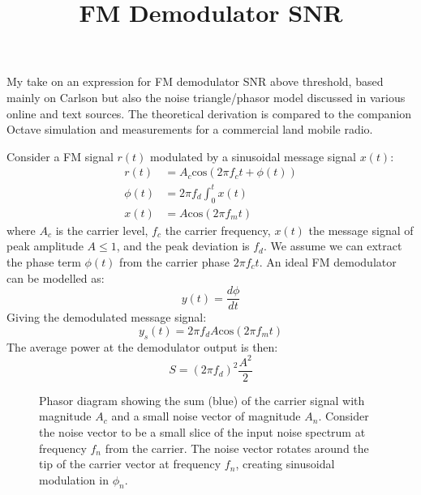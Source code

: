 \documentclass{article}
\begin{document}
\title{FM Demodulator SNR}
\maketitle

My take on an expression for FM demodulator SNR above threshold, based mainly on Carlson \cite{crilly2009communication} but also the noise triangle/phasor model discussed in various online and text sources.  The theoretical derivation is compared to the companion Octave simulation and measurements for a commercial land mobile radio.

Consider a FM signal $r(t)$ modulated by a sinusoidal message signal $x(t)$:
\begin{equation}
\begin{split}
r(t) &= A_c \mathrm{cos}(2 \pi f_c t +\phi(t)) \\
\phi(t) &=  2 \pi f_d \int_0^t x(t) \\
x(t) &= A \mathrm{cos}(2 \pi f_m t)
\end{split}
\end{equation}
where $A_c$ is the carrier level, $f_c$ the carrier frequency, $x(t)$ the message signal of peak amplitude $A \le 1$, and the peak deviation is $f_d$.  We assume we can extract the phase term $\phi(t)$ from the carrier phase $2 \pi f_c t$. An ideal FM demodulator can be modelled as: 
\begin{equation}
\label{eq:fm_demod}
y(t) = \frac{d\phi}{dt}
\end{equation}
Giving the demodulated message signal:
\begin{equation}
\label{eq:fm_signal}
y_s(t) = 2 \pi f_d A \mathrm{cos} (2 \pi f_m t)
\end{equation}
The average power at the demodulator output is then:
\begin{equation}
\label{eq:fm_signal_power}
S = (2 \pi f_d )^2 \frac{A^2}{2}
\end{equation}

\begin{figure}[h]
\begin{center}
\end{center}
\caption{Phasor diagram showing the sum (blue) of the carrier signal with magnitude $A_c$ and a small noise vector of magnitude $A_n$.  Consider the noise vector to be a small slice of the input noise spectrum at frequency $f_n$ from the carrier. The noise vector rotates around the tip of the carrier vector at frequency $f_n$, creating sinusoidal modulation in $\phi_n$.}
\label{fig:phasor}
\end{figure}
\end{document}

